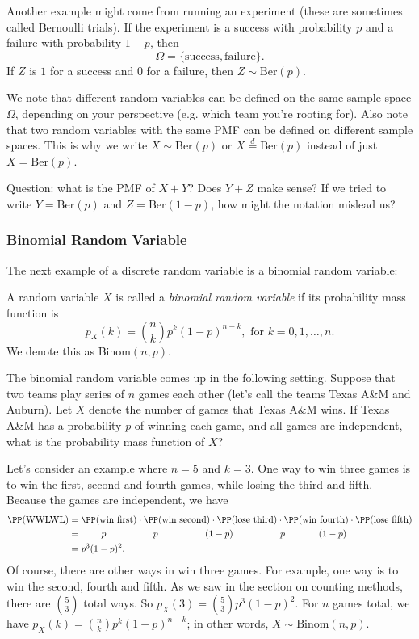 \documentclass{ximera}
\begin{document}
Another example might come from running an experiment (these are sometimes called Bernoulli trials). If the experiment is a success with probability $p$ and a failure with probability $1-p$, then
$$
\Omega = \{\text{success}, \text{failure}\}.
$$
If $Z$ is $1$ for a success and $0$ for a failure, then $Z\sim \text{Ber}(p)$.

We note that different random variables can be defined on the same sample space $\Omega$, depending on your perspective (e.g. which team you're rooting for). Also note that two random variables with the same PMF can be defined on different sample spaces. This is why we write $X \sim \text{Ber}(p)$ or $X\stackrel{d}{=} \text{Ber}(p)$ instead of just $X = \text{Ber}(p)$.

Question: what is the PMF of $X+Y$? Does $Y+Z$ make sense? If we tried to write $Y=\text{Ber}(p)$ and $Z= \text{Ber}(1-p)$, how might the notation mislead us?

\subsubsection{Binomial Random Variable}
The next example of a discrete random variable is a binomial random variable:

\begin{definition}
A random variable $X$ is called a \textit{binomial random variable} if its probability mass function is
$$
p_X(k) = \binom{n}{k} p^k (1-p)^{n-k}, \text{ for } k=0,1,\ldots,n.
$$
We denote this as Binom$(n,p)$.
\end{definition}

The binomial random variable comes up in the following setting. Suppose that two teams play series of $n$ games each other (let's call the teams Texas A\&M and Auburn). Let $X$ denote the number of games that Texas A\&M wins. If Texas A\&M has a probability $p$ of winning each game, and all games are independent, what is the probability mass function of $X$?

Let's consider an example where $n=5$ and $k=3$. One way to win three games is to win the first, second and fourth games, while losing the third and fifth. Because the games are independent, we have
\begin{align*}
\PP(\text{WWLWL}) &= \PP(\text{win first}) \cdot \PP(\text{win second}) \cdot \PP(\text{lose third}) \cdot \PP(\text{win fourth}) \cdot \PP(\text{lose fifth})\\
&= \hspace{0.3in} p \hspace{0.7in} p \hspace{0.7in} (1-p) \hspace{0.7in}  p \hspace{0.5in}  (1-p)\\
&= p^3(1-p)^2.
\end{align*}
Of course, there are other ways in win three games. For example, one way is to win the second, fourth and fifth. As we saw in the section on counting methods, there are $\binom{5}{3}$ total ways. So $p_X(3) = \binom{5}{3}p^3(1-p)^2$. For $n$ games total, we have $p_X(k) = \binom{n}{k} p^k (1-p)^{n-k}$; in other words, $X\sim \text{Binom}(n,p)$. 
\end{document}
